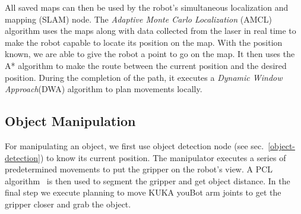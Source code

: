 All saved maps can then be used by the robot's simultaneous localization and mapping (SLAM) node. The \emph{Adaptive Monte Carlo Localization} (AMCL) algorithm \cite{fox:1999} uses the maps along with data collected from the laser in real time to make the robot capable to locate its position on the map. With the position known, we are able to give the robot a point to go on the map. It then uses the A* algorithm to make the route between the current position and the desired position. During the completion of the path, it executes a \emph{Dynamic Window Approach}(DWA) algorithm to plan movements locally.

\subsection{Object Manipulation}\label{manipulation}
For manipulating an object, we first use object detection node (see sec.~\ref{object-detection}) to know its current position. The manipulator executes a series of predetermined movements to put the gripper on the robot's view. A PCL algorithm~\cite{aldoma:2012} is then used to segment the gripper and get object distance. In the final step we execute planning to move KUKA youBot arm joints to get the gripper closer and grab the object.
